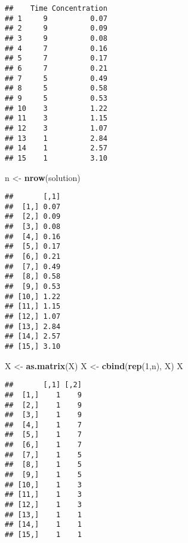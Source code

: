 \documentclass[
]{article}
\newenvironment{Shaded}{\begin{snugshade}}{\end{snugshade}}
\newcommand{\DecValTok}[1]{\textcolor[rgb]{0.00,0.00,0.81}{#1}}
\newcommand{\FunctionTok}[1]{\textcolor[rgb]{0.13,0.29,0.53}{\textbf{#1}}}
\newcommand{\NormalTok}[1]{#1}
\newcommand{\OtherTok}[1]{\textcolor[rgb]{0.56,0.35,0.01}{#1}}
\newcommand{\SpecialCharTok}[1]{\textcolor[rgb]{0.81,0.36,0.00}{\textbf{#1}}}
\begin{document}
\begin{verbatim}
##    Time Concentration
## 1     9          0.07
## 2     9          0.09
## 3     9          0.08
## 4     7          0.16
## 5     7          0.17
## 6     7          0.21
## 7     5          0.49
## 8     5          0.58
## 9     5          0.53
## 10    3          1.22
## 11    3          1.15
## 12    3          1.07
## 13    1          2.84
## 14    1          2.57
## 15    1          3.10
\end{verbatim}

\begin{Shaded}
\begin{Highlighting}[]
\NormalTok{n }\OtherTok{\textless{}{-}} \FunctionTok{nrow}\NormalTok{(solution)}
\end{Highlighting}
\end{Shaded}

\begin{Shaded}
\end{Shaded}

\begin{verbatim}
##       [,1]
##  [1,] 0.07
##  [2,] 0.09
##  [3,] 0.08
##  [4,] 0.16
##  [5,] 0.17
##  [6,] 0.21
##  [7,] 0.49
##  [8,] 0.58
##  [9,] 0.53
## [10,] 1.22
## [11,] 1.15
## [12,] 1.07
## [13,] 2.84
## [14,] 2.57
## [15,] 3.10
\end{verbatim}

\begin{Shaded}
\begin{Highlighting}[]
\NormalTok{X }\OtherTok{\textless{}{-}} \FunctionTok{as.matrix}\NormalTok{(X)}
\NormalTok{X }\OtherTok{\textless{}{-}} \FunctionTok{cbind}\NormalTok{(}\FunctionTok{rep}\NormalTok{(}\DecValTok{1}\NormalTok{,n), X)}
\NormalTok{X}
\end{Highlighting}
\end{Shaded}

\begin{verbatim}
##       [,1] [,2]
##  [1,]    1    9
##  [2,]    1    9
##  [3,]    1    9
##  [4,]    1    7
##  [5,]    1    7
##  [6,]    1    7
##  [7,]    1    5
##  [8,]    1    5
##  [9,]    1    5
## [10,]    1    3
## [11,]    1    3
## [12,]    1    3
## [13,]    1    1
## [14,]    1    1
## [15,]    1    1
\end{verbatim}
\end{document}
